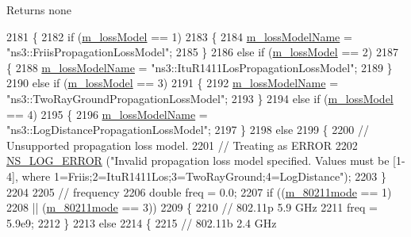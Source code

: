 \begin{DoxyReturn}{Returns}
none 
\end{DoxyReturn}

\begin{DoxyCode}
2181 \{
2182   \textcolor{keywordflow}{if} (\hyperlink{classVanetRoutingExperiment_a6ca0dcdbcabbd60f246855590b4ee4f5}{m\_lossModel} == 1)
2183     \{
2184       \hyperlink{classVanetRoutingExperiment_a973b4d1f55f7e425e1564db1cfd503f1}{m\_lossModelName} = \textcolor{stringliteral}{"ns3::FriisPropagationLossModel"};
2185     \}
2186   \textcolor{keywordflow}{else} \textcolor{keywordflow}{if} (\hyperlink{classVanetRoutingExperiment_a6ca0dcdbcabbd60f246855590b4ee4f5}{m\_lossModel} == 2)
2187     \{
2188       \hyperlink{classVanetRoutingExperiment_a973b4d1f55f7e425e1564db1cfd503f1}{m\_lossModelName} = \textcolor{stringliteral}{"ns3::ItuR1411LosPropagationLossModel"};
2189     \}
2190   \textcolor{keywordflow}{else} \textcolor{keywordflow}{if} (\hyperlink{classVanetRoutingExperiment_a6ca0dcdbcabbd60f246855590b4ee4f5}{m\_lossModel} == 3)
2191     \{
2192       \hyperlink{classVanetRoutingExperiment_a973b4d1f55f7e425e1564db1cfd503f1}{m\_lossModelName} = \textcolor{stringliteral}{"ns3::TwoRayGroundPropagationLossModel"};
2193     \}
2194   \textcolor{keywordflow}{else} \textcolor{keywordflow}{if} (\hyperlink{classVanetRoutingExperiment_a6ca0dcdbcabbd60f246855590b4ee4f5}{m\_lossModel} == 4)
2195     \{
2196       \hyperlink{classVanetRoutingExperiment_a973b4d1f55f7e425e1564db1cfd503f1}{m\_lossModelName} = \textcolor{stringliteral}{"ns3::LogDistancePropagationLossModel"};
2197     \}
2198   \textcolor{keywordflow}{else}
2199     \{
2200       \textcolor{comment}{// Unsupported propagation loss model.}
2201       \textcolor{comment}{// Treating as ERROR}
2202       \hyperlink{group__logging_ga0261a8db1d4ac5f79417d117634fd455}{NS\_LOG\_ERROR} (\textcolor{stringliteral}{"Invalid propagation loss model specified.  Values must be [1-4], where
       1=Friis;2=ItuR1411Los;3=TwoRayGround;4=LogDistance"});
2203     \}
2204 
2205   \textcolor{comment}{// frequency}
2206   \textcolor{keywordtype}{double} freq = 0.0;
2207   \textcolor{keywordflow}{if} ((\hyperlink{classVanetRoutingExperiment_aae21b34a7fb447a2d7d5bcbcbe8e5fae}{m\_80211mode} == 1)
2208       || (\hyperlink{classVanetRoutingExperiment_aae21b34a7fb447a2d7d5bcbcbe8e5fae}{m\_80211mode} == 3))
2209     \{
2210       \textcolor{comment}{// 802.11p 5.9 GHz}
2211       freq = 5.9e9;
2212     \}
2213   \textcolor{keywordflow}{else}
2214     \{
2215       \textcolor{comment}{// 802.11b 2.4 GHz}

\end{DoxyCode}
